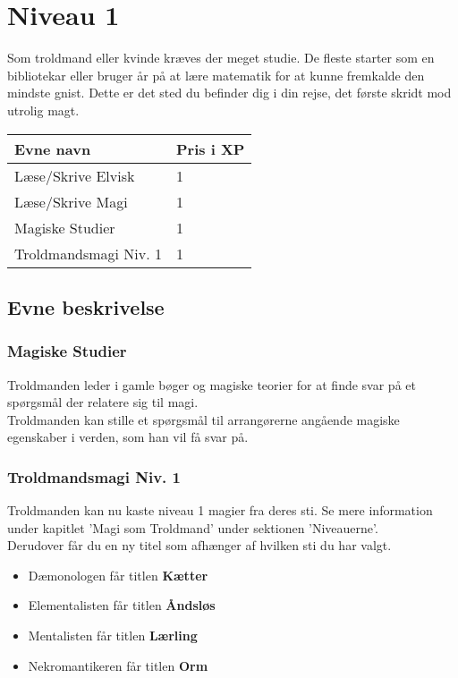 \chapter{Niveau 1}
Som troldmand eller kvinde kræves der meget studie. De fleste starter som en bibliotekar eller bruger år på at lære matematik for at kunne fremkalde den mindste gnist. Dette er det sted du befinder dig i din rejse, det første skridt mod utrolig magt. 

\begin{table}[H]
    \centering
    \begin{tabular}{|p{}|p{}|}
    \rowcolor{cerulean!80}\hline
        Evne navn & Pris i XP \\\hline
        Læse/Skrive Elvisk & 1\\\hline
        Læse/Skrive Magi & 1\\\hline
        Magiske Studier & 1\\\hline
        Troldmandsmagi Niv. 1 & 1\\\hline
    \end{tabular}
\end{table}

\section{Evne beskrivelse}





\subsection{Magiske Studier}
Troldmanden leder i gamle bøger og magiske teorier for at finde svar på et spørgsmål der relatere sig til magi.\\
Troldmanden kan stille et spørgsmål til arrangørerne angående magiske egenskaber i verden, som han vil få svar på.

\subsection{Troldmandsmagi Niv. 1}
Troldmanden kan nu kaste niveau 1 magier fra deres sti. Se mere information under kapitlet 'Magi som Troldmand' under sektionen 'Niveauerne'. \\
Derudover får du en ny titel som afhænger af hvilken sti du har valgt.\\
\begin{itemize}
    \item Dæmonologen får titlen \textbf{Kætter}
    \item Elementalisten får titlen \textbf{Åndsløs}
    \item Mentalisten får titlen \textbf{Lærling}
    \item Nekromantikeren får titlen \textbf{Orm}
\end{itemize}